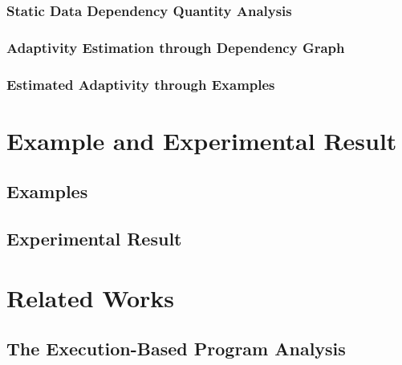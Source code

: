 \documentclass[12pt, letterpaper]{report}   %
\begin{document}
\subsection{Static Data Dependency Quantity Analysis}
\label{sec:static-quantity}


\subsection{Adaptivity Estimation through Dependency Graph}
\label{sec:static-adapt}


\subsection{Estimated Adaptivity through Examples}
\label{sec:static-examples}


% 

\clearpage
\chapter{Example and Experimental Result }
\label{sec:adapt-implementation}
\section{Examples}
\label{sec:adapt-example}

\section{Experimental Result}
\label{sec:adapt-eval}


\chapter{Related Works}
\label{sec:adapt-relatedwork}

\section{The Execution-Based Program Analysis}
\label{sec:relatedwork-exe}

\end{document}
